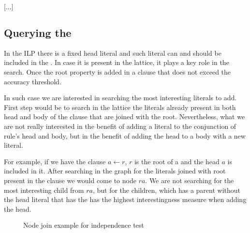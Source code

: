 [...]

\subsection{Querying the \graphname}

In the ILP there is a fixed head literal and such literal can and should be included in the \graphname. In case it is
present in the lattice, it plays a key role in the search. Once the root property is added in a clause that does not
exceed the accuracy threshold.

In such case we are interested in searching the most interesting literals to add. First step would be to search in the
lattice the literals already present in both head and body of the clause that are joined with the root. Nevertheless,
what we are not really interested in the benefit of adding a literal to the conjunction of rule's head and body, but in
the benefit of adding the head to a body with a new literal.

For example, if we have the clause $a \leftarrow r$, $r$ is the root of a \graphname and the head $a$ is included in it.
After searching in the graph for the literals joined with root present in the clause we would come to node
$ra$. We are not searching for the most interesting child from $ra$, but for the children, which has a parent without
the head literal that has the has the highest interestingness measure when adding the head.

\begin{figure}[!h]
  \caption{Node join example for independence test}
  \centering
  \label{fig:latticeSuggestion}
\end{figure}

